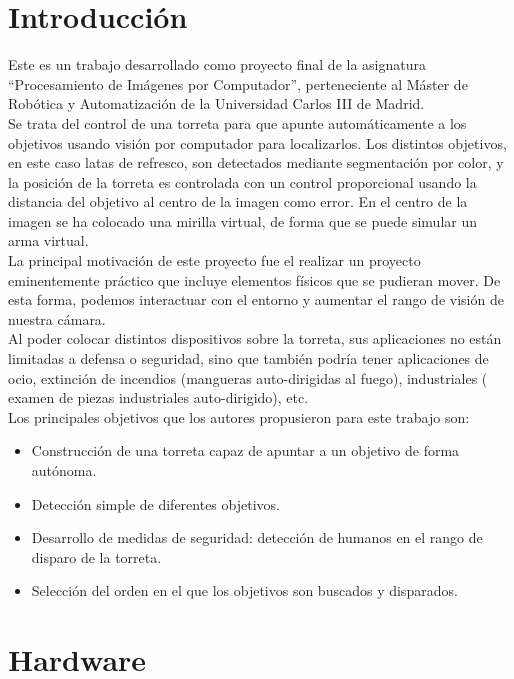 \section{Introducción}
Este es un trabajo desarrollado como proyecto final de la asignatura “Procesamiento de Imágenes por Computador”, perteneciente al Máster de Robótica y Automatización de la Universidad Carlos III de Madrid.\\

Se trata del control de una torreta para que apunte automáticamente a los objetivos usando visión por computador para localizarlos. Los distintos objetivos, en este caso latas de refresco, son detectados mediante segmentación por color, y la posición de la torreta es controlada con un control proporcional usando la distancia del objetivo al centro de la imagen como error. En el centro de la imagen se ha colocado una mirilla virtual, de forma que se puede simular un arma virtual.\\

La principal motivación de este proyecto fue el realizar un proyecto eminentemente práctico que incluye elementos físicos que se pudieran mover. De esta forma, podemos interactuar con el entorno y aumentar el rango de visión de nuestra cámara.\\

Al poder colocar distintos dispositivos sobre la torreta, sus aplicaciones no están limitadas a defensa o seguridad, sino que también podría tener aplicaciones de ocio, extinción de incendios (mangueras auto-dirigidas al fuego), industriales ( examen de piezas industriales auto-dirigido), etc.\\

Los principales objetivos que los autores propusieron para este trabajo son:
\begin{itemize}
\item Construcción de una torreta capaz de apuntar a un objetivo de forma autónoma.
\item Detección simple de diferentes objetivos.
\item Desarrollo de medidas de seguridad: detección de humanos en el rango de disparo de la torreta.
\item Selección del orden en el que los objetivos son buscados y disparados.
\end{itemize}

\newpage

\section{Hardware}

